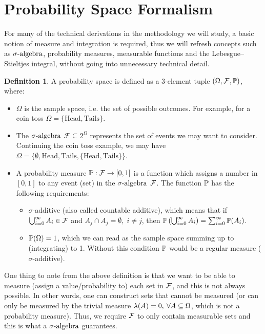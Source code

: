 \documentclass[a4paper,12pt,twoside,openright]{report}
\theoremstyle{definition}
\newtheorem{definition}{Definition}[section]
\begin{document}
\section{Probability Space Formalism}

For many of the technical derivations in the methodology we will study, a basic notion of measure and integration is required, thus we will refresh concepts such as $\sigalg$, probability measures,  measurable functions and the Lebesgue–Stieltjes integral, without going into unnecessary technical detail.

\begin{definition} \label{def:prob_space}
A probability space is defined as a 3-element tuple $\probspace$, where:
\begin{itemize}
    \item $\Omega$ is the sample space, i.e. the set of possible outcomes. For example, for a coin toss $\Omega=\{\text{Head}, \text{Tails}\}$. 
    \item The $\sigalg$ $\mathcal{F} \subseteq 2^{\Omega}$ represents the set of events we may want to consider. Continuing the coin toss example, we may have $\Omega=\{\emptyset, \text{Head}, \text{Tails},\{\text{Head}, \text{Tails}\}\}$.
    \item A probability measure $\P:\calF \rightarrow [0,1]$ is a function which assigns a number in $[0,1]$ to any event (set) in the $\sigalg$ $\calF$. The function $\P$ has the following requirements:
    \begin{itemize}
        \item $\sigma$-additive (also called countable additive), which means that if  $\bigcup_{i=0}^\infty  A_i\in \calF$ and $A_j \cap A_j = \emptyset, \; i \neq j$, then $\P\left(\bigcup_{i=0}^\infty A_i\right) =\sum_{i=0}^\infty \P(A_i) $.
        \item $\P(\Omega)=1$, which we can read as the sample space summing up to (integrating) to 1.  Without this condition $\P$ would be a regular measure ($\sigma$-additive).
    \end{itemize}
\end{itemize}
\end{definition}
One thing to note from the above definition is that we want to be able to measure (assign a value/probability to) each set in $\calF$, and this is not always possible. In other words, one can construct sets that cannot be measured (or can only be measured by the trivial measure $\callambda(A) = 0,\:\forall A \subseteq \Omega$, which is not a probability measure). Thus, we require $\calF$ to only contain measurable sets and this is what a $\sigalg$ guarantees.
\end{document}
